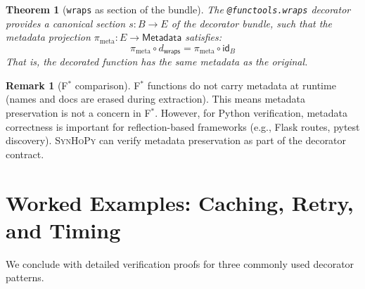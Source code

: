 \documentclass[11pt,a4paper]{report}
\theoremstyle{definition}
\newtheorem{remark}[definition]{Remark}
\theoremstyle{plain}
\newtheorem{theorem}[definition]{Theorem}
\newcommand{\fstar}{F$^{*}$}
\newcommand{\synhopy}{\textsc{SynHoPy}}
\begin{document}
\begin{theorem}[\texttt{wraps} as section of the bundle]
\label{thm:wraps-section}
The \texttt{@functools.wraps} decorator provides a canonical section
$s : B \to E$ of the decorator bundle, such that the metadata projection
$\pi_{\mathrm{meta}} : E \to \mathsf{Metadata}$ satisfies:
\[
  \pi_{\mathrm{meta}} \circ d_{\mathsf{wraps}} = \pi_{\mathrm{meta}} \circ \mathsf{id}_B
\]
That is, the decorated function has the same metadata as the original.
\end{theorem}

\begin{remark}[\fstar{} comparison]
\fstar{} functions do not carry metadata at runtime (names and docs are erased
during extraction). This means metadata preservation is not a concern in
\fstar{}. However, for Python verification, metadata correctness is important
for reflection-based frameworks (e.g., Flask routes, pytest discovery).
\synhopy{} can verify metadata preservation as part of the decorator contract.
\end{remark}


\section{Worked Examples: Caching, Retry, and Timing}
\label{sec:decorator-examples}

We conclude with detailed verification proofs for three commonly used
decorator patterns.
\end{document}
